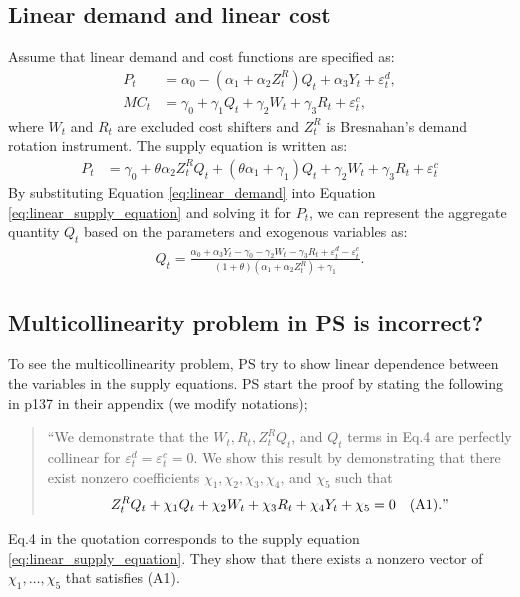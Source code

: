 \documentclass[11pt, a4paper]{article}
\begin{document}
\subsection{Linear demand and linear cost}
Assume that linear demand and cost functions are specified as:
\begin{align}
    P_t &= \alpha_0 - (\alpha_1 + \alpha_2Z^{R}_{t})Q_{t} + \alpha_3 Y_t + \varepsilon^{d}_{t},\label{eq:linear_demand}\\
    MC_t &= \gamma_0  + \gamma_1 Q_{t} + \gamma_2 W_{t} + \gamma_3 R_{t} + \varepsilon^{c}_{t},\label{eq:linear_marginal_cost}
\end{align}
where $W_{t}$ and $R_{t}$ are excluded cost shifters and $Z^{R}_{t}$ is Bresnahan's demand rotation instrument. 
The supply equation is written as:
\begin{align}
    P_t 
    &= \gamma_0 + \theta \alpha_2 Z^{R}_tQ_{t} + (\theta\alpha_1 + \gamma_1) Q_{t} + \gamma_2 W_t + \gamma_3 R_{t} +\varepsilon^c_t\label{eq:linear_supply_equation}
\end{align}
By substituting Equation \eqref{eq:linear_demand} into Equation \eqref{eq:linear_supply_equation} and solving it for $P_t$, we can represent the aggregate quantity $Q_{t}$ based on the parameters and exogenous variables as:
\begin{align}
    Q_{t} =  \frac{\alpha_0 + \alpha_3 Y_t - \gamma_0 - \gamma_2 W_{t} - \gamma_3 R_{t} + \varepsilon^{d}_{t} - \varepsilon^{c}_{t}}{(1 + \theta) (\alpha_1 + \alpha_2 Z^{R}_{t}) + \gamma_1}.\label{eq:quantity_linear}
\end{align}

\subsection{Multicollinearity problem in PS is incorrect?}
To see the multicollinearity problem, PS try to show linear dependence between the variables in the supply equations. 
PS start the proof by stating the following in p137 in their appendix (we modify notations);
\begin{quote}
    ``We demonstrate that the $W_{t}, R_{t}, Z^{R}_{t}Q_{t}$, and $Q_{t}$ terms in Eq.4 are perfectly collinear for $\varepsilon_{t}^{d} = \varepsilon_{t}^{c} = 0$. We show this result by demonstrating that there exist nonzero coefficients $\chi_1,\chi_2,\chi_3,\chi_4$, and $\chi_5$ such that 
   \begin{align*}
    Z^{R}_{t} Q_{t} + \chi_1 Q_{t} + \chi_2 W_{t} + \chi_3 R_{t} + \chi_4 Y_{t} + \chi_5 = 0 \quad (\text{A1})."
    \end{align*}
\end{quote}
Eq.4 in the quotation corresponds to the supply equation \eqref{eq:linear_supply_equation}.
They show that there exists a nonzero vector of $\chi_1, \ldots, \chi_5$ that satisfies (A1).
\end{document}
